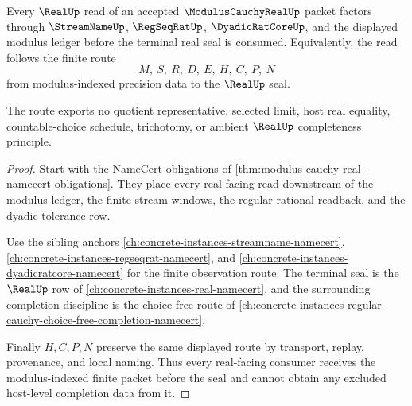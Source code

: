 \begin{theorem}
\label{thm:modulus-cauchy-real-real-seal-route}
Every $\RealUp$ read of an accepted $\ModulusCauchyRealUp$ packet factors through $\StreamNameUp$, $\RegSeqRatUp$, $\DyadicRatCoreUp$, and the displayed modulus ledger before the terminal real seal is consumed. Equivalently, the read follows the finite route
$$
M,\ S,\ R,\ D,\ E,\ H,\ C,\ P,\ N
$$
from modulus-indexed precision data to the $\RealUp$ seal.

The route exports no quotient representative, selected limit, host real equality, countable-choice schedule, trichotomy, or ambient $\RealUp$ completeness principle.
\end{theorem}
\begin{proof}
Start with the NameCert obligations of \autoref{thm:modulus-cauchy-real-namecert-obligations}. They place every real-facing read downstream of the modulus ledger, the finite stream windows, the regular rational readback, and the dyadic tolerance row.

Use the sibling anchors \autoref{ch:concrete-instances-streamname-namecert}, \autoref{ch:concrete-instances-regseqrat-namecert}, and \autoref{ch:concrete-instances-dyadicratcore-namecert} for the finite observation route. The terminal seal is the $\RealUp$ row of \autoref{ch:concrete-instances-real-namecert}, and the surrounding completion discipline is the choice-free route of \autoref{ch:concrete-instances-regular-cauchy-choice-free-completion-namecert}.

Finally $H,C,P,N$ preserve the same displayed route by transport, replay, provenance, and local naming. Thus every real-facing consumer receives the modulus-indexed finite packet before the seal and cannot obtain any excluded host-level completion data from it.
\end{proof}

\begin{closurestatus}{\ModulusCauchyRealUp}
  \theoryclosure{\seedClosure}
  \formalstatus{\unformalizedV}
\end{closurestatus}
